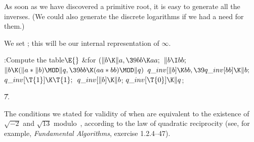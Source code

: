 As soon as we have discovered
a primitive root, it is easy to generate all the inverses. (We
could also generate the discrete logarithms if we had a need for them.)

We set ; this will be our internal representation
of $\infty$.

\Y\B\4:Compute the  table\X${}\E{}$\6
\&{for} ${}(\|b\K\|a,\39\\{bb}\K\\{aa};{}$ ${}\|b\I\\{bb};{}$ ${}\|b\K(\|a*\|b)%
\MOD\|q,\39\\{bb}\K(\\{aa}*\\{bb})\MOD\|q){}$\1\5
${}\\{q\_inv}[\|b]\K\\{bb},\39\\{q\_inv}[\\{bb}]\K\|b;{}$\2\6
${}\\{q\_inv}[\T{1}]\K\T{1};{}$\6
${}\\{q\_inv}[\|b]\K\|b{}$;\6
${}\\{q\_inv}[\T{0}]\K\|q{}$;\par
\U7.\fi

The conditions we stated for validity of  when 
are equivalent
to the existence of $\sqrt{-2}$ and $\sqrt{13}$ modulo~, according
to the law of quadratic reciprocity (see, for example, {\sl Fundamental
Algorithms}, exercise 1.2.4--47).

